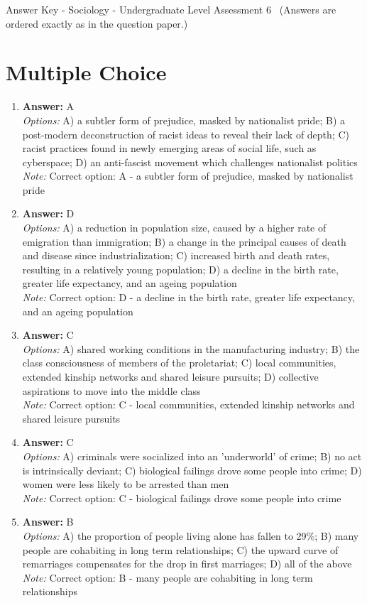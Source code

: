 \documentclass[12pt]{article}
\begin{document}
\begin{center}
Answer Key - Sociology - Undergraduate Level Assessment 6 \
\small (Answers are ordered exactly as in the question paper.)
\end{center}

\section*{Multiple Choice}
\begin{enumerate}[label=\arabic*.]
\item \textbf{Answer:} A
\\ \textit{Options:} A) a subtler form of prejudice, masked by nationalist pride; B) a post-modern deconstruction of racist ideas to reveal their lack of depth; C) racist practices found in newly emerging areas of social life, such as cyberspace; D) an anti-fascist movement which challenges nationalist politics
\\ \textit{Note:} Correct option: A - a subtler form of prejudice, masked by nationalist pride
\item \textbf{Answer:} D
\\ \textit{Options:} A) a reduction in population size, caused by a higher rate of emigration than immigration; B) a change in the principal causes of death and disease since industrialization; C) increased birth and death rates, resulting in a relatively young population; D) a decline in the birth rate, greater life expectancy, and an ageing population
\\ \textit{Note:} Correct option: D - a decline in the birth rate, greater life expectancy, and an ageing population
\item \textbf{Answer:} C
\\ \textit{Options:} A) shared working conditions in the manufacturing industry; B) the class consciousness of members of the proletariat; C) local communities, extended kinship networks and shared leisure pursuits; D) collective aspirations to move into the middle class
\\ \textit{Note:} Correct option: C - local communities, extended kinship networks and shared leisure pursuits
\item \textbf{Answer:} C
\\ \textit{Options:} A) criminals were socialized into an 'underworld' of crime; B) no act is intrinsically deviant; C) biological failings drove some people into crime; D) women were less likely to be arrested than men
\\ \textit{Note:} Correct option: C - biological failings drove some people into crime
\item \textbf{Answer:} B
\\ \textit{Options:} A) the proportion of people living alone has fallen to 29\%; B) many people are cohabiting in long term relationships; C) the upward curve of remarriages compensates for the drop in first marriages; D) all of the above
\\ \textit{Note:} Correct option: B - many people are cohabiting in long term relationships
\end{enumerate}
\end{document}
